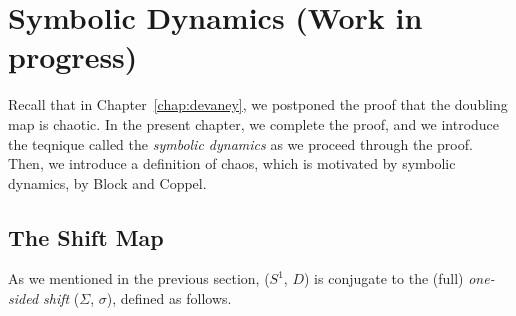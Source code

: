 \documentclass[10pt,twoside]{book}
\begin{document}
\chapter{Symbolic Dynamics (Work in progress)}
\label{chap:symbolic}
Recall that in Chapter~\ref{chap:devaney}, we postponed the proof that the doubling map is chaotic.
In the present chapter, we complete the proof, and we introduce the teqnique called the \textit{symbolic dynamics} as we proceed through the proof.
Then, we introduce a definition of chaos, which is motivated by symbolic dynamics, by Block and Coppel.


\section{The Shift Map}
As we mentioned in the previous section, ($S^1$, $D$) is conjugate to the (full) \textit{one-sided shift} ($\Sigma$, $\sigma$), defined as follows.
\end{document}

